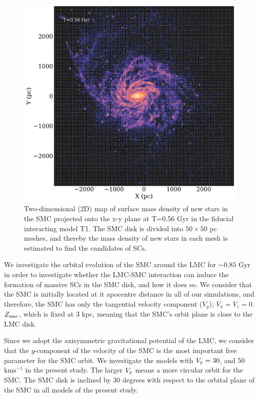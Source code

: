\documentclass[fleqn,usenatbib]{mnras}
\begin{document}
\begin{figure}
 \includegraphics[width=\columnwidth]{3..png}
 \caption{Two-dimensional (2D) map of surface mass density of new stars in the SMC projected onto the x-y plane at T=0.56 Gyr in the fiducial interacting model T1. The SMC disk is divided into $50 \times 50$ pc meshes, and thereby the mass density of new stars in each mesh is estimated to find the candidates of SCs.}
 \label{fig:3Mesh}
\end{figure}

We investigate the orbital evolution of the SMC around the LMC for ${\sim} 0.85$ Gyr in order to investigate whether the LMC-SMC interaction can induce the formation of massive SCs in the SMC disk, and how it does so. 
We consider that the SMC is initially located at it apocentre distance in all of our simulations, and therefore, the SMC has only the tangential velocity component ($V_y$); $V_x=V_z=0$. $Z_{\rm smc}$, which is fixed at 3 kpc, meaning that the SMC's orbit plane is close to the LMC disk.

Since we adopt the axisymmetric gravitational potential of the LMC, we consider that the $y$-component of the velocity of the SMC
is the most important free parameter for the SMC orbit. 
We investigate the models with $V_{\rm y}=30$, and 50 $\text{km}\text{s}^{-1}$ in the present study.
The larger $V_{\rm y}$ means a more circular orbit for the SMC. The SMC disk is inclined by 30 degrees with respect to the orbital plane of the SMC in all models of the present study.
\end{document}
